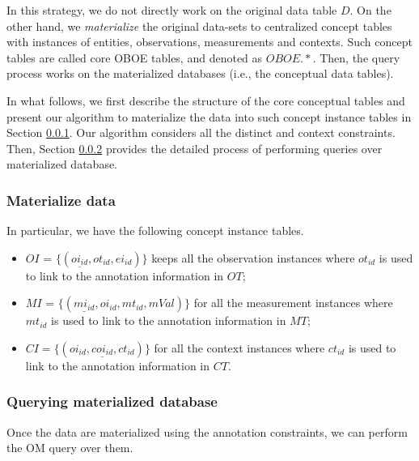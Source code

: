 In this strategy, we do not directly work on the original data table
$D$. On the other hand, we {\em materialize} the original data-sets to
centralized concept tables with instances of entities, observations, measurements
and contexts. Such concept tables are called core OBOE tables, and denoted as
$OBOE.*$.
Then, the query process works on the materialized databases (i.e., the
conceptual data tables).

In what follows, we first describe the structure of the core
conceptual tables and present our algorithm to materialize the data into such
concept instance tables in Section \ref{sec:materialilzedb}. Our
algorithm considers all the distinct and context constraints.
Then, Section \ref{sec:query_materialilzedb} provides the detailed
process of performing queries over materialized database.

\subsubsection{Materialize data}\label{sec:materialilzedb}

In particular, we have the following concept instance tables.
\begin{itemize}
\item $OI$ = $\{(\underline{oi_{id}}, ot_{id}, ei_{id})\}$ keeps
  all the observation instances where $ot_{id}$ is used to link to the
  annotation information in $OT$;
\item $MI$ = $\{(\underline{mi_{id}}, oi_{id}, mt_{id},
  mVal)\}$ for all the measurement instances where $mt_{id}$ is used to link to the
  annotation information in $MT$;
\item $CI =\{(\underline{oi_{id},coi_{id},ct_{id}})\}$ for
  all the context instances where $ct_{id}$ is used to link to the
  annotation information in $CT$.
\end{itemize}


\subsubsection{Querying materialized database}\label{sec:query_materialilzedb}

Once the data are materialized using the annotation constraints, we
can perform the OM query over them.


